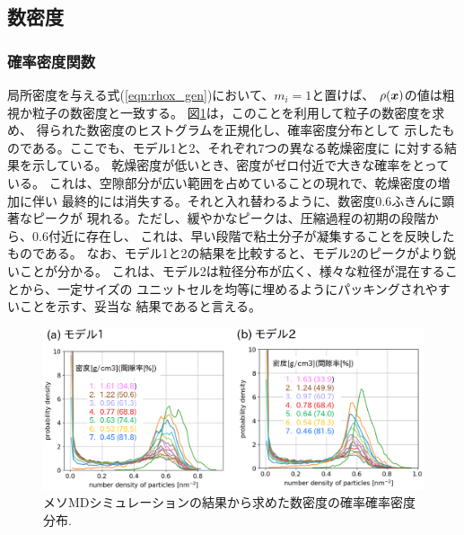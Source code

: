\subsection{数密度}
\subsubsection{確率密度関数}
局所密度を与える式(\ref{eqn:rhox_gen})において、$m_i=1$と置けば、
$\rho(\mbox{\boldmath $x$})$の値は粗視か粒子の数密度と一致する。
図\ref{fig:fig8}は，このことを利用して粒子の数密度を求め、
得られた数密度のヒストグラムを正規化し、確率密度分布として
示したものである。ここでも、モデル1と2、それぞれ7つの異なる乾燥密度に
に対する結果を示している。
乾燥密度が低いとき、密度がゼロ付近で大きな確率をとっている。
これは、空隙部分が広い範囲を占めていることの現れで、乾燥密度の増加に伴い
最終的には消失する。それと入れ替わるように、数密度0.6ふきんに顕著なピークが
現れる。ただし、緩やかなピークは、圧縮過程の初期の段階から、0.6付近に存在し、
これは、早い段階で粘土分子が凝集することを反映したものである。
なお、モデル1と2の結果を比較すると、モデル2のピークがより鋭いことが分かる。
これは、モデル2は粒径分布が広く、様々な粒径が混在することから、一定サイズの
ユニットセルを均等に埋めるようにパッキングされやすいことを示す、妥当な
結果であると言える。
\begin{figure}[h]
	\begin{center}
	\includegraphics[width=1.0\linewidth]{Figs/fig8.eps} 
	\end{center}
	\caption{
		メソMDシミュレーションの結果から求めた数密度の確率確率密度分布.
	} 
	\label{fig:fig8}
\end{figure}
